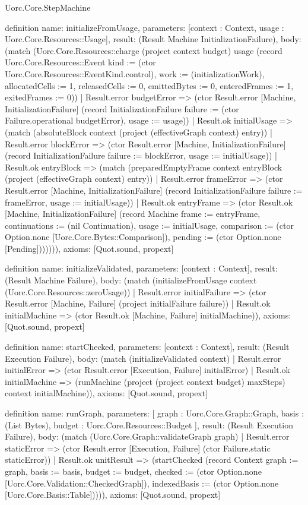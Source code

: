 \begin{lexlean}{Uorc.Core.StepMachine}
\begin{semanticmodule}
definition{
  name: initializeFromUsage,
  parameters: [context : Context, usage : Uorc.Core.Resources::Usage],
  result: (Result Machine InitializationFailure),
  body: (match (Uorc.Core.Resources::charge (project context budget) usage (record Uorc.Core.Resources::Event {kind := (ctor Uorc.Core.Resources::EventKind.control), work := (initializationWork), allocatedCells := 1, releasedCells := 0, emittedBytes := 0, enteredFrames := 1, exitedFrames := 0}))
    | Result.error budgetError => (ctor Result.error [Machine, InitializationFailure] (record InitializationFailure {failure := (ctor Failure.operational budgetError), usage := usage}))
    | Result.ok initialUsage => (match (absoluteBlock context (project (effectiveGraph context) entry))
      | Result.error blockError => (ctor Result.error [Machine, InitializationFailure] (record InitializationFailure {failure := blockError, usage := initialUsage}))
      | Result.ok entryBlock => (match (preparedEmptyFrame context entryBlock (project (effectiveGraph context) entry))
        | Result.error frameError => (ctor Result.error [Machine, InitializationFailure] (record InitializationFailure {failure := frameError, usage := initialUsage}))
        | Result.ok entryFrame => (ctor Result.ok [Machine, InitializationFailure] (record Machine {frame := entryFrame, continuations := (nil Continuation), usage := initialUsage, comparison := (ctor Option.none [Uorc.Core.Bytes::Comparison]), pending := (ctor Option.none [Pending])}))))),
  axioms: [Quot.sound, propext]
}

definition{
  name: initializeValidated,
  parameters: [context : Context],
  result: (Result Machine Failure),
  body: (match (initializeFromUsage context (Uorc.Core.Resources::zeroUsage))
    | Result.error initialFailure => (ctor Result.error [Machine, Failure] (project initialFailure failure))
    | Result.ok initialMachine => (ctor Result.ok [Machine, Failure] initialMachine)),
  axioms: [Quot.sound, propext]
}

definition{
  name: startChecked,
  parameters: [context : Context],
  result: (Result Execution Failure),
  body: (match (initializeValidated context)
    | Result.error initialError => (ctor Result.error [Execution, Failure] initialError)
    | Result.ok initialMachine => (runMachine (project (project context budget) maxSteps) context initialMachine)),
  axioms: [Quot.sound, propext]
}

definition{
  name: runGraph,
  parameters: [
    graph : Uorc.Core.Graph::Graph,
    basis : (List Bytes),
    budget : Uorc.Core.Resources::Budget
  ],
  result: (Result Execution Failure),
  body: (match (Uorc.Core.Graph::validateGraph graph)
    | Result.error staticError => (ctor Result.error [Execution, Failure] (ctor Failure.static staticError))
    | Result.ok unitResult => (startChecked (record Context {graph := graph, basis := basis, budget := budget, checked := (ctor Option.none [Uorc.Core.Validation::CheckedGraph]), indexedBasis := (ctor Option.none [Uorc.Core.Basis::Table])}))),
  axioms: [Quot.sound, propext]
}


\end{semanticmodule}
\end{lexlean}
